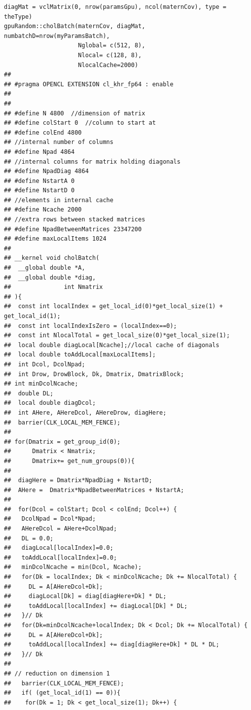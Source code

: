 \documentclass[article,nojss]{jss}\usepackage[]{graphicx}\usepackage[]{color}
\makeatletter
\newenvironment{kframe}{%
 \def\at@end@of@kframe{}%
 \ifinner\ifhmode%
  \def\at@end@of@kframe{\end{minipage}}%
  \begin{minipage}{\columnwidth}%
 \fi\fi%
 \def\FrameCommand##1{\hskip\@totalleftmargin \hskip-\fboxsep
 \colorbox{shadecolor}{##1}\hskip-\fboxsep
     \hskip-\linewidth \hskip-\@totalleftmargin \hskip\columnwidth}%
 \MakeFramed {\advance\hsize-\width
   \@totalleftmargin\z@ \linewidth\hsize
   \@setminipage}}%
 {\par\unskip\endMakeFramed%
 \at@end@of@kframe}
\newenvironment{knitrout}{}{} %
\makeatother
\begin{document}
\begin{knitrout}
\color{fgcolor}\begin{kframe}
\begin{verbatim}
diagMat = vclMatrix(0, nrow(paramsGpu), ncol(maternCov), type = theType)
gpuRandom::cholBatch(maternCov, diagMat, numbatchD=nrow(myParamsBatch),
                     Nglobal= c(512, 8),
                     Nlocal= c(128, 8),
                     NlocalCache=2000)
## 
## #pragma OPENCL EXTENSION cl_khr_fp64 : enable
## 
## 
## #define N 4800  //dimension of matrix
## #define colStart 0  //column to start at
## #define colEnd 4800
## //internal number of columns
## #define Npad 4864
## //internal columns for matrix holding diagonals
## #define NpadDiag 4864
## #define NstartA 0
## #define NstartD 0
## //elements in internal cache
## #define Ncache 2000
## //extra rows between stacked matrices
## #define NpadBetweenMatrices 23347200
## #define maxLocalItems 1024
## 
## __kernel void cholBatch(
## 	__global double *A,
## 	__global double *diag,
##               int Nmatrix
## ){
##  const int localIndex = get_local_id(0)*get_local_size(1) + get_local_id(1);
##  const int localIndexIsZero = (localIndex==0);
##  const int NlocalTotal = get_local_size(0)*get_local_size(1);
##  local double diagLocal[Ncache];//local cache of diagonals
##  local double toAddLocal[maxLocalItems];
##  int Dcol, DcolNpad;
##  int Drow, DrowBlock, Dk, Dmatrix, DmatrixBlock;
## int minDcolNcache;
##  double DL;
##  local double diagDcol;
##  int AHere, AHereDcol, AHereDrow, diagHere;
##  barrier(CLK_LOCAL_MEM_FENCE);
## 
## for(Dmatrix = get_group_id(0);
##      Dmatrix < Nmatrix;
##      Dmatrix+= get_num_groups(0)){
## 
##  diagHere = Dmatrix*NpadDiag + NstartD;
##  AHere =  Dmatrix*NpadBetweenMatrices + NstartA;
## 
##  for(Dcol = colStart; Dcol < colEnd; Dcol++) {
##   DcolNpad = Dcol*Npad;
##   AHereDcol = AHere+DcolNpad;
##   DL = 0.0;
##   diagLocal[localIndex]=0.0;
##   toAddLocal[localIndex]=0.0;
##   minDcolNcache = min(Dcol, Ncache);
##   for(Dk = localIndex; Dk < minDcolNcache; Dk += NlocalTotal) {
##     DL = A[AHereDcol+Dk];
##     diagLocal[Dk] = diag[diagHere+Dk] * DL;
##     toAddLocal[localIndex] += diagLocal[Dk] * DL;
##   }// Dk
##   for(Dk=minDcolNcache+localIndex; Dk < Dcol; Dk += NlocalTotal) {
##     DL = A[AHereDcol+Dk];
##     toAddLocal[localIndex] += diag[diagHere+Dk] * DL * DL;
##   }// Dk
## 
## // reduction on dimension 1
##   barrier(CLK_LOCAL_MEM_FENCE);
##   if( (get_local_id(1) == 0)){
##    for(Dk = 1; Dk < get_local_size(1); Dk++) {

\end{verbatim}
\end{kframe}
\end{knitrout}
\end{document}
